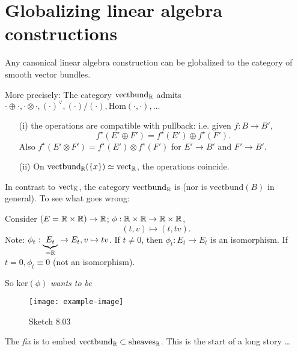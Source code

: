 \section{Globalizing linear algebra constructions}

\begin{theorem}\label{thm:8.4}
    Any  canonical linear algebra construction can be globalized 
    to the category of smooth vector bundles. 

    More precisely: The category \(\text{vectbund}_{\mathbb{R}}\) admits 
    \(\cdot \oplus \cdot,\cdot \otimes \cdot,(\cdot)^\vee,(\cdot)/(\cdot), \text{Hom}(\cdot,\cdot),\dots\)

    \begin{enumerate}
        \item[(i)] the operations are compatible with pullback: i.e. given \(f:B\to B'\),
        \[f^\star(E'\oplus F')=f^\star(E')\oplus f^\star(F').\]
        Also \(f^\star(E'\otimes F')=f^\star(E')\otimes f^\star(F')\) for \(E'\to B'\) and \(F'\to B'\).  
        \item[(ii)] On \(\text{vectbund}_{\mathbb{R}}(\{x\})\simeq \text{vect}_{\mathbb{R}}\), the operations coincide. 
    \end{enumerate}
\end{theorem}

\begin{remark}[Warning]
    In contrast to \(\text{vect}_{\mathbb{K}}\), the category \(\text{vectbund}_{\mathbb{R}}\) is  (nor is 
    \(\text{vectbund}(B)\) in general). To see  what goes wrong:

    Consider \((E=\mathbb{R}\times \mathbb{R})\to \mathbb{R}\); \(\phi:\mathbb{R}\times \mathbb{R} \to \mathbb{R}\times \mathbb{R}\), 
    \[(t,v)\mapsto (t,tv).\]
    Note: \(\phi_t:\underbrace{E_t}_{=\mathbb{R}}\to E_t, v\mapsto tv\). If \(t\neq 0\), then \(\phi_t:E_t\to E_t\)
    is an isomorphism. If \(t=0,\phi_t\equiv 0\) (not an isomorphism).
    
    So \(\text{ker}(\phi)\) \textit{wants to be}
    \begin{figure}[H]\label{fig:8.03}
        \centering
        \texttt{[image: example-image]}
        \caption{Sketch 8.03}
    \end{figure}
    The \textit{fix} is to embed \(\text{vectbund}_{\mathbb{R}}\subset\text{sheaves}_{\mathbb{R}}\). 
    This is the start of a long story \dots 
\end{remark}

